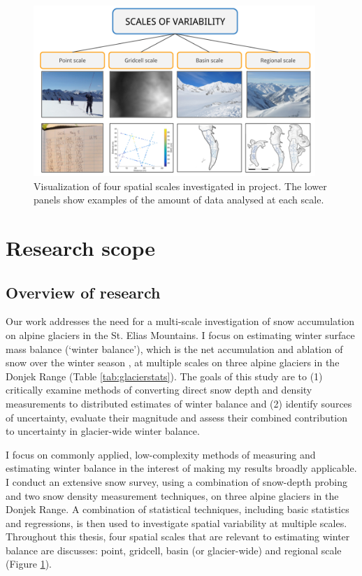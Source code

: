 \documentclass{sfuthesis}
\begin{document}
  \begin{figure}
           \includegraphics[width = 0.95\textwidth]{ScalesOfVariability.png}
       \caption{Visualization of four spatial scales investigated in project. The lower panels show examples of the amount of data analysed at each scale.}
       \label{fig:flowchart_scales}
\end{figure}

\section{Research scope}
\label{sec:ResearchScope}

\subsection{Overview of research}
Our work addresses the need for a multi-scale investigation of snow accumulation on alpine glaciers in the St. Elias Mountains. I focus on estimating winter surface mass balance (`winter balance'), which is the net accumulation and ablation of snow over the winter season \citep{Cogley2011}, at multiple scales on three alpine glaciers in the Donjek Range (Table \ref{tab:glacierstats}). The goals of this study are to (1) critically examine methods of converting direct snow depth and density measurements to distributed estimates of winter balance and (2) identify sources of uncertainty, evaluate their magnitude and assess their combined contribution to uncertainty in glacier-wide winter balance. 

I focus on commonly applied, low-complexity methods of measuring and estimating winter balance in the interest of making my results broadly applicable. I conduct an extensive snow survey, using a combination of snow-depth probing and two snow density measurement techniques, on three alpine glaciers in the Donjek Range. A combination of statistical techniques, including basic statistics and regressions, is then used to investigate spatial variability at multiple scales. Throughout this thesis, four spatial scales that are relevant to estimating winter balance are discusses: point, gridcell, basin (or glacier-wide) and regional scale (Figure \ref{fig:flowchart_scales}). 
\end{document}
